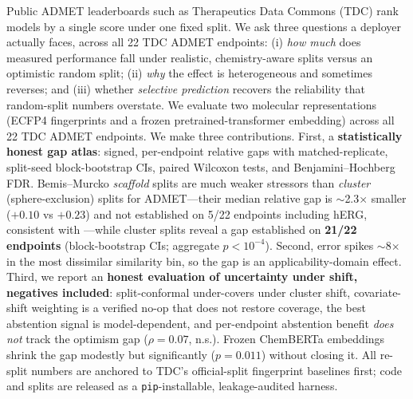 Public ADMET leaderboards such as Therapeutics Data Commons (TDC) rank models by a
single score under one fixed split. We ask three questions a deployer actually faces, across
all 22 TDC ADMET endpoints: (i) \emph{how much} does measured
performance fall under realistic, chemistry-aware splits versus an optimistic random split;
(ii) \emph{why} the effect is heterogeneous and sometimes reverses; and (iii) whether
\emph{selective prediction} recovers the reliability that random-split numbers overstate. We
evaluate two molecular representations (ECFP4 fingerprints and a frozen pretrained-transformer
embedding) across all 22 TDC ADMET endpoints. We make three contributions. First, a
\textbf{statistically honest gap atlas}: signed, per-endpoint relative gaps with matched-replicate,
split-seed block-bootstrap CIs, paired Wilcoxon tests, and Benjamini--Hochberg FDR. Bemis--Murcko
\emph{scaffold} splits are much weaker stressors than \emph{cluster} (sphere-exclusion) splits for
ADMET---their median relative gap is $\sim$2.3$\times$ smaller ($+0.10$ vs $+0.23$) and not
established on 5/22 endpoints including hERG, consistent with \citet{fooladi2025evaluating}---while
cluster splits reveal a gap established on \textbf{21/22 endpoints} (block-bootstrap CIs; aggregate
$p<10^{-4}$). Second, error spikes $\sim$8$\times$ in the most dissimilar similarity bin, so the gap
is an applicability-domain effect. Third, we report an \textbf{honest evaluation of
uncertainty under shift, negatives included}: split-conformal under-covers under cluster shift,
covariate-shift weighting is a verified no-op that does not restore coverage, the best abstention
signal is model-dependent, and per-endpoint abstention benefit \emph{does not} track the optimism
gap ($\rho=0.07$, n.s.). Frozen ChemBERTa embeddings shrink the gap modestly but significantly
($p=0.011$) without closing it. All re-split numbers are anchored to TDC's official-split fingerprint
baselines first; code and splits are released as a \texttt{pip}-installable, leakage-audited harness.
